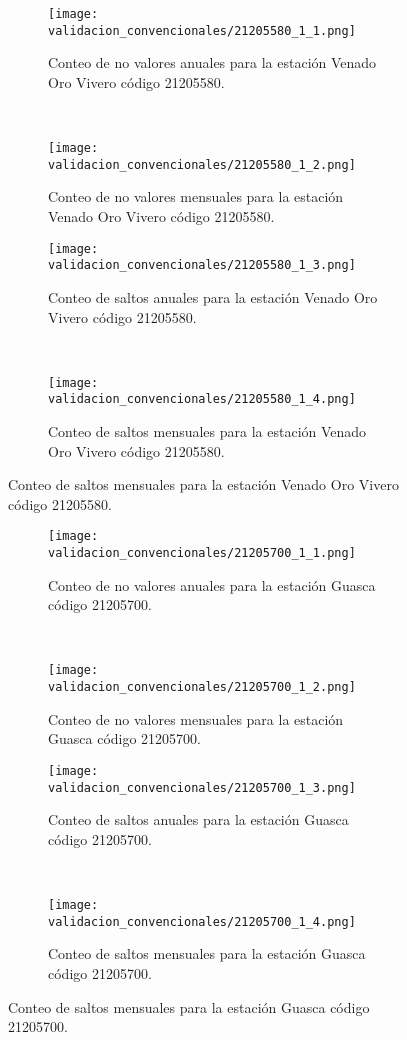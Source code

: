 \begin{figure}[H]\ContinuedFloat
\centering
	\begin{subfigure}[normla]{0.4\textwidth}
	\texttt{[image: validacion\_convencionales/21205580\_1\_1.png]}
		\caption{Conteo de no valores anuales para la estación Venado Oro Vivero código 21205580.}
		\label{subfig:a1}
		\end{subfigure}
		~
    \begin{subfigure}[normla]{0.4\textwidth}
	\texttt{[image: validacion\_convencionales/21205580\_1\_2.png]}
		\caption{Conteo de no valores mensuales para la estación Venado Oro Vivero código 21205580.}
		\label{subfig:a2}
		\end{subfigure}
		
    \begin{subfigure}[normla]{0.4\textwidth}
	\texttt{[image: validacion\_convencionales/21205580\_1\_3.png]}
		\caption{Conteo de saltos anuales para la estación Venado Oro Vivero código 21205580.}
		\label{subfig:a1}
		\end{subfigure}
		~
    \begin{subfigure}[normla]{0.4\textwidth}
	\texttt{[image: validacion\_convencionales/21205580\_1\_4.png]}
		\caption{Conteo de saltos mensuales para la estación Venado Oro Vivero código 21205580.}
		\label{subfig:a2}
		\end{subfigure}

	
\end{figure}
           
\begin{figure}[H]\ContinuedFloat
\centering
	\begin{subfigure}[normla]{0.4\textwidth}
	\texttt{[image: validacion\_convencionales/21205700\_1\_1.png]}
		\caption{Conteo de no valores anuales para la estación Guasca código 21205700.}
		\label{subfig:a1}
		\end{subfigure}
		~
    \begin{subfigure}[normla]{0.4\textwidth}
	\texttt{[image: validacion\_convencionales/21205700\_1\_2.png]}
		\caption{Conteo de no valores mensuales para la estación Guasca código 21205700.}
		\label{subfig:a2}
		\end{subfigure}
		
    \begin{subfigure}[normla]{0.4\textwidth}
	\texttt{[image: validacion\_convencionales/21205700\_1\_3.png]}
		\caption{Conteo de saltos anuales para la estación Guasca código 21205700.}
		\label{subfig:a1}
		\end{subfigure}
		~
    \begin{subfigure}[normla]{0.4\textwidth}
	\texttt{[image: validacion\_convencionales/21205700\_1\_4.png]}
		\caption{Conteo de saltos mensuales para la estación Guasca código 21205700.}
		\label{subfig:a2}
		\end{subfigure}

	
\end{figure}
           
